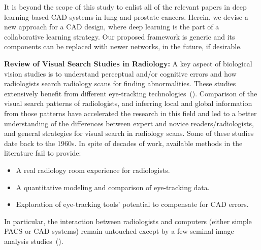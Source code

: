 \documentclass[preprint,12pt]{elsarticle}
\begin{document}
It is beyond the scope of this study to enlist all of the relevant papers in deep learning-based CAD systems in lung and prostate cancers. Herein, we devise a new approach for a CAD design, where deep learning is the part of a collaborative learning strategy. Our proposed framework is generic and its components can be replaced with newer networks, in the future, if desirable.

\textbf{Review of Visual Search Studies in Radiology:}
A key aspect of biological vision studies is to understand perceptual and/or cognitive errors and how radiologists search radiology scans for finding abnormalities. These studies extensively benefit from different eye-tracking technologies~(\cite{venjakob2016review}). Comparison of the visual search patterns of radiologists, and inferring local and global information from those patterns have accelerated the research in this field and led to a better understanding of the differences between expert and novice readers/radiologists, and general strategies for visual search in radiology scans. Some of these studies date back to the 1960s. In spite of decades of work, available methods in the literature fail to provide:
\begin{itemize}
\item A real radiology room experience for radiologists.
\item A quantitative modeling and comparison of eye-tracking data.
\item Exploration of eye-tracking tools’ potential to compensate for CAD errors.
\end{itemize}
In particular, the interaction between radiologists and computers (either simple PACS or CAD systems) remain untouched except by a few seminal image analysis studies~(\cite{drew2013scanners,khosravan2016gaze2segment,venjakob2016image}).
\end{document}
